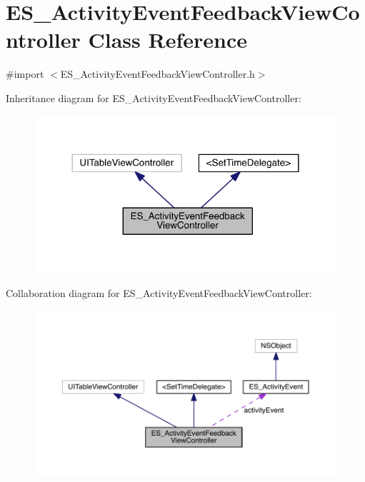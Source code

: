 \hypertarget{interface_e_s___activity_event_feedback_view_controller}{\section{E\+S\+\_\+\+Activity\+Event\+Feedback\+View\+Controller Class Reference}
\label{interface_e_s___activity_event_feedback_view_controller}
}


{\ttfamily \#import $<$E\+S\+\_\+\+Activity\+Event\+Feedback\+View\+Controller.\+h$>$}



Inheritance diagram for E\+S\+\_\+\+Activity\+Event\+Feedback\+View\+Controller\+:\nopagebreak
\begin{figure}[H]
\begin{center}
\leavevmode
\includegraphics[width=317pt]{dc/d7e/interface_e_s___activity_event_feedback_view_controller__inherit__graph}
\end{center}
\end{figure}


Collaboration diagram for E\+S\+\_\+\+Activity\+Event\+Feedback\+View\+Controller\+:\nopagebreak
\begin{figure}[H]
\begin{center}
\leavevmode
\includegraphics[width=350pt]{d2/d90/interface_e_s___activity_event_feedback_view_controller__coll__graph}
\end{center}
\end{figure}
